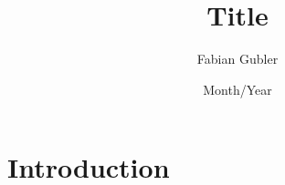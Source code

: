\documentclass{article}
\title{Title}
\author{Fabian Gubler}
\date{Month/Year}
\begin{document}
\maketitle

\section{Introduction}
\end{document}

